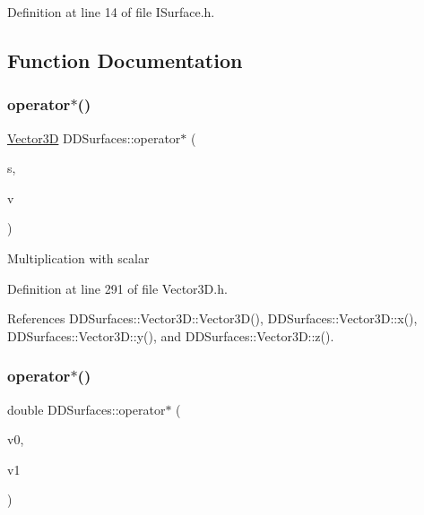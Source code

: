 Definition at line 14 of file I\+Surface.\+h.



\subsection{Function Documentation}
\hypertarget{namespace_d_d_surfaces_a6bbc0c2ca88c4b8e2fdcaf98199f4cd8}{}\label{namespace_d_d_surfaces_a6bbc0c2ca88c4b8e2fdcaf98199f4cd8} 
\subsubsection{\texorpdfstring{operator$\ast$()}{operator*()}\hspace{0.1cm}{\footnotesize\ttfamily [1/2]}}
{\footnotesize\ttfamily \hyperlink{class_d_d_surfaces_1_1_vector3_d}{Vector3D} D\+D\+Surfaces\+::operator$\ast$ (\begin{DoxyParamCaption}\item[{double}]{s,  }\item[{const \hyperlink{class_d_d_surfaces_1_1_vector3_d}{Vector3D} \&}]{v }\end{DoxyParamCaption})\hspace{0.3cm}{\ttfamily [inline]}}

Multiplication with scalar 

Definition at line 291 of file Vector3\+D.\+h.



References D\+D\+Surfaces\+::\+Vector3\+D\+::\+Vector3\+D(), D\+D\+Surfaces\+::\+Vector3\+D\+::x(), D\+D\+Surfaces\+::\+Vector3\+D\+::y(), and D\+D\+Surfaces\+::\+Vector3\+D\+::z().

\hypertarget{namespace_d_d_surfaces_ac26468a9e0a55f857dd466023fd49e53}{}\label{namespace_d_d_surfaces_ac26468a9e0a55f857dd466023fd49e53} 
\subsubsection{\texorpdfstring{operator$\ast$()}{operator*()}\hspace{0.1cm}{\footnotesize\ttfamily [2/2]}}
{\footnotesize\ttfamily double D\+D\+Surfaces\+::operator$\ast$ (\begin{DoxyParamCaption}\item[{const \hyperlink{class_d_d_surfaces_1_1_vector3_d}{Vector3D} \&}]{v0,  }\item[{const \hyperlink{class_d_d_surfaces_1_1_vector3_d}{Vector3D} \&}]{v1 }\end{DoxyParamCaption})\hspace{0.3cm}{\ttfamily [inline]}}



